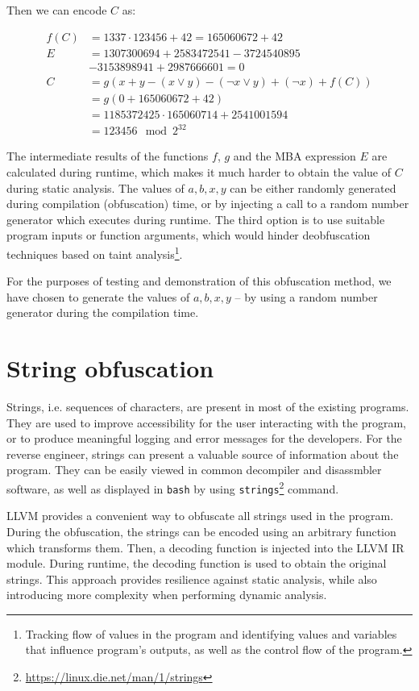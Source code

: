 \documentclass[
  digital, %
  notable,   %
  twoside, %
  nolof,     %
  nolot,     %
]{fithesis3}
\theoremstyle{definition}
\begin{document}
Then we can encode $C$ as:

\begin{align*}
    f(C) &= 1337\cdot 123456 + 42 = 165060672 + 42 \\
    E &= 1307300694 + 2583472541 - 3724540895\\& - 3153898941 + 2987666601 = 0 \\
    C &= g(x + y - (x \vee y)-(\neg x \vee y)+(\neg x) + f(C)) \\
    &= g(0 + 165060672 + 42) \\
    &= 1185372425\cdot165060714 + 2541001594\\
    &= 123456 \mod 2^{32}
\end{align*}

The intermediate results of the functions $f$, $g$ and the MBA expression $E$ are calculated during runtime, which makes it much harder to obtain the value of $C$ during static analysis. The values of $a,b,x,y$ can be either randomly generated during compilation (obfuscation) time,  or by injecting a call to a random number generator which executes during runtime. The third option is to use suitable program inputs or function arguments, which would hinder deobfuscation techniques based on taint analysis\footnote{Tracking flow of values in the program and identifying values and variables that influence program's outputs, as well as the control flow of the program.}. 

For the purposes of testing and demonstration of this obfuscation method, we have chosen to generate the values of $a,b,x,y$ -- by using a random number generator during the compilation time.

\section{String obfuscation}

Strings, i.e. sequences of characters, are present in most of the existing programs. They are used to improve accessibility for the user interacting with the program, or to produce meaningful logging and error messages for the developers. For the reverse engineer, strings can present a valuable source of information about the program. They can be easily viewed in common decompiler and disassmbler software, as well as displayed in \texttt{bash} by using \texttt{strings}\footnote{\url{https://linux.die.net/man/1/strings}} command.

LLVM provides a convenient way to obfuscate all strings used in the program. During the obfuscation, the strings can be encoded using an arbitrary function which transforms them. Then, a decoding function is injected into the LLVM IR module. During runtime, the decoding function is used to obtain the original strings. This approach provides resilience against static analysis, while also introducing more complexity when performing dynamic analysis. 
\end{document}

